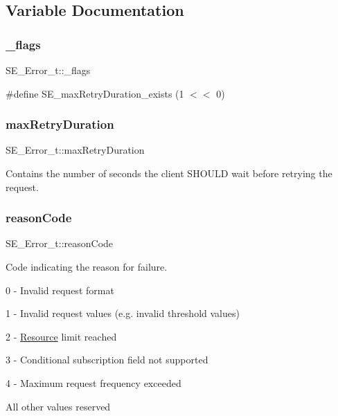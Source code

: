 \subsection{Variable Documentation}
\mbox{\label{group__Error_ga8aa22215f51b089c7bdb02b69c5fd9eb}} 
\subsubsection{\texorpdfstring{\+\_\+flags}{\_flags}}
{\footnotesize\ttfamily S\+E\+\_\+\+Error\+\_\+t\+::\+\_\+flags}

\#define S\+E\+\_\+max\+Retry\+Duration\+\_\+exists (1 $<$$<$ 0) \mbox{\label{group__Error_ga0e519f8abdfdbf90cb4262b3670c8a87}} 
\subsubsection{\texorpdfstring{max\+Retry\+Duration}{maxRetryDuration}}
{\footnotesize\ttfamily S\+E\+\_\+\+Error\+\_\+t\+::max\+Retry\+Duration}

Contains the number of seconds the client S\+H\+O\+U\+LD wait before retrying the request. \mbox{\label{group__Error_gac36d2114ba2736c8052d850778818b78}} 
\subsubsection{\texorpdfstring{reason\+Code}{reasonCode}}
{\footnotesize\ttfamily S\+E\+\_\+\+Error\+\_\+t\+::reason\+Code}

Code indicating the reason for failure.

0 -\/ Invalid request format

1 -\/ Invalid request values (e.\+g. invalid threshold values)

2 -\/ \hyperlink{structResource}{Resource} limit reached

3 -\/ Conditional subscription field not supported

4 -\/ Maximum request frequency exceeded

All other values reserved 